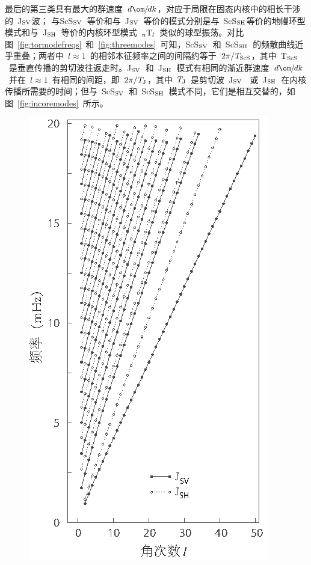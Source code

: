 {%
%
最后的第三类具有最大的群速度~$d\om\hspace{-0.2 mm}/\hspace{-0.3 mm}dk$，对应于局限在固态内核中的相长干涉的~J${}_{\rm SV}$波；
%
%
与ScS${}_{\rm SV}$~等价和与~J${}_{\rm SV}$~等价的模式分别是与~ScS${}_{\rm SH}$等价的地幔环型模式和与~J${}_{\rm SH}$~等价的内核环型模式~${}_n{\rm T}_l$~类似的球型振荡。对比图~\ref{fig:tormodefreqs}~和~\ref{fig:threemodes}~可知，ScS${}_{\rm SV}$~和~ScS${}_{\rm SH}$~的频散曲线近乎重叠；两者中~$l\approx 1$~的相邻本征频率之间的间隔约等于~$2\pi/\hspace{0.2 mm}T_{\rm ScS}$，其中~T${}_{\rm ScS}$~是垂直传播的剪切波往返走时。J${}_{\rm SV}$~和~J${}_{\rm SH}$~模式有相同的渐近群速度~$d\om\hspace{-0.2 mm}/\hspace{-0.3 mm}dk$~并在~$l\approx 1$~有相同的间距，即~$2\pi/\hspace{0.2 mm}T_{\rm J}$，其中~$T_{\rm J}$~是剪切波~J${}_{\rm SV}$~
或~J${}_{\rm SH}$~在内核传播所需要的时间；但与~ScS${}_{\rm SV}$~和~ScS${}_{\rm SH}$~模式不同，它们是相互交替的，如图~\ref{fig:incoremodes}~所示。
\begin{figure}
\begin{center}
\includegraphics{../figures/chap08/fig13.eps}

\end{center}
\end{figure}}
